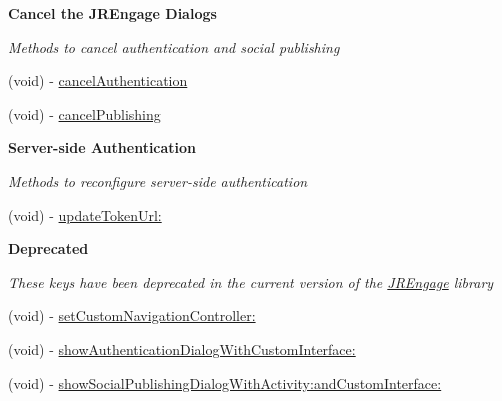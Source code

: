 \begin{Indent}{\bf Cancel the JREngage Dialogs}\par
{\em \label{_amgrpd07ee85d05cc5dd13dd0e31682479a39}
 Methods to cancel authentication and social publishing }\begin{DoxyCompactItemize}
\item 
(void) -\/ \hyperlink{class_j_r_engage_a17b67c9bb98230fb7d59f8c35a20662b}{cancelAuthentication}
\item 
(void) -\/ \hyperlink{class_j_r_engage_a205c368338061976178a5b0e36f2d4f2}{cancelPublishing}
\end{DoxyCompactItemize}
\end{Indent}
\begin{Indent}{\bf Server-\/side Authentication}\par
{\em \label{_amgrp1fc6cae7bdf84f91a0bad45f5891f15e}
 Methods to reconfigure server-\/side authentication }\begin{DoxyCompactItemize}
\item 
(void) -\/ \hyperlink{class_j_r_engage_ac0fb45ee43767dfdea0057bb93000db6}{updateTokenUrl:}
\end{DoxyCompactItemize}
\end{Indent}
\begin{Indent}{\bf Deprecated}\par
{\em \label{_amgrp0ac54cb10e7494cff1949826e8e32f7b}
 These keys have been deprecated in the current version of the \hyperlink{class_j_r_engage}{JREngage} library }\begin{DoxyCompactItemize}
\item 
(void) -\/ \hyperlink{class_j_r_engage_a6c704bbff377d20603e6b52bd0ae17f1}{setCustomNavigationController:}
\item 
(void) -\/ \hyperlink{class_j_r_engage_ac8e1206be8608fbed548b7ec5f85e6e6}{showAuthenticationDialogWithCustomInterface:}
\item 
(void) -\/ \hyperlink{class_j_r_engage_af5c2aa40f5c45a22f369900d1bd81953}{showSocialPublishingDialogWithActivity:andCustomInterface:}
\end{DoxyCompactItemize}
\end{Indent}



